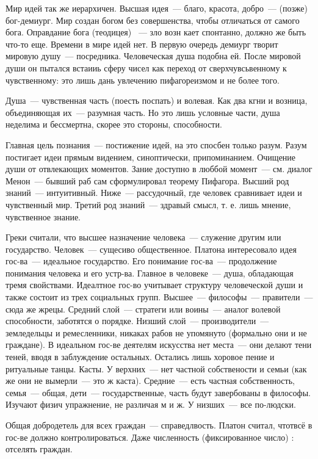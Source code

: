 Мир идей так же иерархичен. Высшая идея~--- благо, красота, добро~--- (позже) бог-демиург. Мир создан богом без совершенства, чтобы отличаться от самого бога. Оправдание бога (теодицея) ~--- зло возн кает спонтанно, должно же быть что-то еще. 
Времени в мире идей нет. В первую очередь демиург творит мировую душу~--- посредника. Человеческая душа подобна ей. 
После мировой души он пытался встаииь сферу чисел как переход от сверхчувсьвенному к чувственному: это лишь дань увлечению пифагореизмом и не более того. 

Душа~--- чувственная часть (поесть поспать) и волевая. Как два кгни и возница, объединяющая их~--- разумная часть. Но это лишь условные части, душа неделима и бессмертна, скорее это стороны, способности. 

Главная цель познания~--- постижение идей, на это спосбен только разум. Разум постигает идеи прямым видением, синоптически, припоминанием. 
Очищение души от отвлекающих моментов. Зание доступно в люббой момент~--- см. диалог Менон~--- бывший раб сам сформулировал теорему Пифагора. 
Высший род знаний~--- интуитивный. Ниже~--- рассудочный, где человек сравнивает идеи и чувственный мир. Третий род знаний~--- здравый смысл, т. е. лишь мнение, чувственное знание. 

Греки считали, что высшее назначение человека~--- служение другим или государство. Человек~--- сущесиво общественное. 
Платона интересовало идея гос-ва~--- идеальное государство. Его понимание гос-ва~--- продолжение понимания человека и его устр-ва. Главное в человеке~--- душа, обладающая тремя свойствами. 
Идеалтное гос-во учитывает структуру человеческой души и также состоит из трех социальных групп. Высшее~--- философы~--- правители~--- сюда же жрецы. Средний слой~--- стратеги или воины~--- аналог волевой способности, заботятся о порядке. 
Низший слой~--- производители~--- земледельцы и ремесленники, никаках рабов не упомянуто (формально они и не граждане). 
В идеальном гос-ве деятелям искусства нет места~--- они делают тени теней, вводя в заблуждение остальных. Остались лишь хоровое пение и ритуальные танцы. Касты. 
У верхних~--- нет частной собствености и семьи (как же они не вымерли~--- это ж каста). Средние~--- есть частная собственность, семья~--- общая, дети~--- государственные, часть будут завербованы в философы. 
Изучают физич упражнение, не различая м и ж. 
У низших~--- все по-людски. 

Общая добродетель для всех граждан~--- справедлвость. 
Платон считал, чтотвсё в гос-ве должно контролироваться. Даже численность (фиксированное число) : отселять граждан. 

